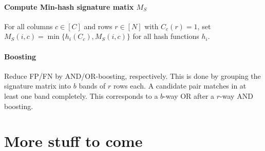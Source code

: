 \documentclass[a4paper, 9pt, DIV=24]{scrartcl}
\begin{document}
\begin{twocolumn}
\paragraph{Compute Min-hash signature matix $M_S$}
For all columns $c \in [C]$ and rows $r \in [N]$ with $C_c(r) = 1$, set $M_S(i,c) = \min\{h_i(C_c), M_S(i,c)\}$ for all hash functions $h_i$.

\paragraph{Boosting} Reduce FP/FN by AND/OR-boosting, respectively. \newline
This is done by grouping the signature matrix into $b$ bands of $r$ rows each.
A candidate pair matches in at least one band completely. This corresponds to a $b$-way OR after a $r$-way AND boosting.

\section{More stuff to come}

\end{twocolumn}

\appendix
\end{document}
